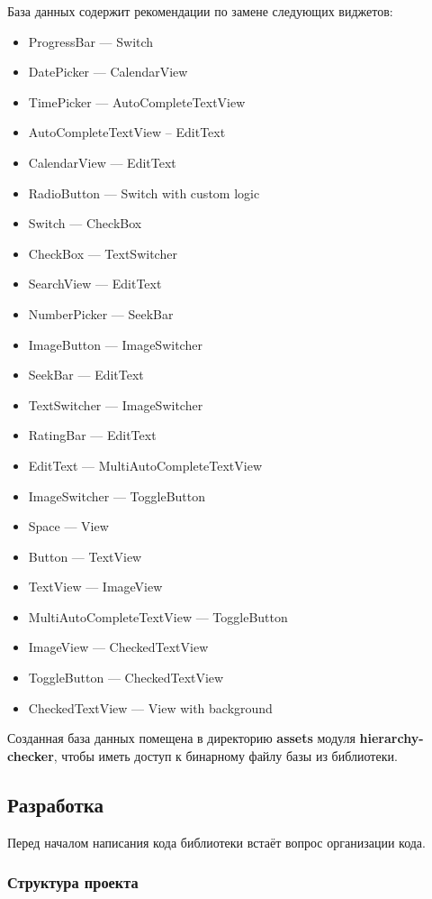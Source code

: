 \documentclass[a4paper,14pt]{extarticle} %
\begin{document}
	База данных содержит рекомендации по замене следующих виджетов:
	\begin{itemize}
		\item ProgressBar --- Switch
		\item DatePicker --- CalendarView
		\item TimePicker --- AutoCompleteTextView
		\item AutoCompleteTextView – EditText
		\item CalendarView --- EditText
		\item RadioButton --- Switch with custom logic
		\item Switch --- CheckBox
		\item CheckBox --- TextSwitcher
		\item SearchView --- EditText
		\item NumberPicker --- SeekBar
		\item ImageButton --- ImageSwitcher
		\item SeekBar --- EditText
		\item TextSwitcher --- ImageSwitcher
		\item RatingBar --- EditText
		\item EditText --- MultiAutoCompleteTextView
		\item ImageSwitcher --- ToggleButton
		\item Space --- View
		\item Button --- TextView
		\item TextView --- ImageView
		\item MultiAutoCompleteTextView --- ToggleButton
		\item ImageView --- CheckedTextView
		\item ToggleButton --- CheckedTextView
		\item CheckedTextView --- View with background
	\end{itemize}

	Созданная база данных помещена в директорию \textbf{assets} модуля \textbf{hierarchy-checker}, чтобы иметь доступ к бинарному файлу базы из библиотеки.

	\subsection{Разработка}
	
	Перед началом написания кода библиотеки встаёт вопрос организации кода.
	
	\subsubsection{Структура проекта}
	
\end{document}
